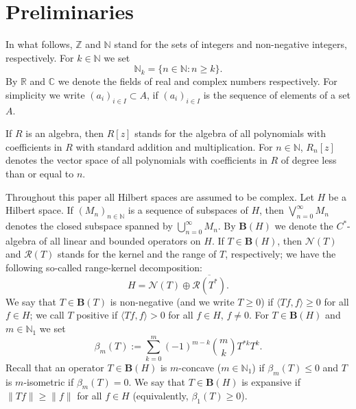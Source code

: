 \documentclass{amsart}
\renewcommand{\le}{\leqslant}
\renewcommand{\ge}{\geqslant}
\theoremstyle{definition}
\numberwithin{equation}{section}
\begin{document}
\section{Preliminaries}
\label{SecPreliminaries}
In what follows, $ \mathbb{Z} $ and $ \mathbb{N} $ stand for the sets of integers and non-negative integers, respectively. For $ k\in \mathbb{N} $ we set
\begin{equation*}
    \mathbb{N}_{k} = \{n\in \mathbb{N}\colon n\ge k \}.
\end{equation*}
By $ \mathbb{R} $ and $ \mathbb{C} $ we denote the fields of real and complex numbers respectively. For simplicity we write $ (a_{i})_{i\in I} \subset A $, if $ (a_{i})_{i\in I} $ is the sequence of elements of a set $ A $.\par
If $ R $ is an algebra, then $ R[z] $ stands for the algebra of all polynomials with coefficients in $ R $ with standard addition and multiplication. For $ n\in \mathbb{N} $, $ R_{n}[z] $ denotes the vector space of all polynomials with coefficients in $ R $ of degree less than or equal to $ n $.\par
Throughout this paper all Hilbert spaces are assumed to be complex. Let $ H $ be a Hilbert space. If $ (M_{n})_{n\in \mathbb{N}} $ is a sequence of subspaces of $ H $, then $ \bigvee_{n=0}^{\infty}M_{n} $ denotes the closed subspace spanned by $ \bigcup_{n=0}^{\infty}M_{n} $. By $ \mathbf{B}(H) $ we denote the $ C^{\ast} $-algebra of all linear and bounded operators on $ H $. If $ T\in \mathbf{B}(H) $, then $ \mathcal{N}(T) $ and $ \mathcal{R}(T) $ stands for the kernel and the range of $ T $, respectively; we have the following so-called range-kernel decomposition:
\begin{equation}
    \label{FormRangeKernelDecomp}
    H = \mathcal{N}(T)\oplus \overline{\mathcal{R}(T^{\ast})}.
\end{equation}
We say that $ T\in \mathbf{B}(T) $ is non-negative (and we write $ T\ge 0 $) if $ \langle Tf,f\rangle \ge 0 $ for all $ f\in H $; we call $ T $ positive if $ \langle Tf,f\rangle > 0 $ for all $ f\in H $, $ f\not=0 $. For $ T\in \mathbf{B}(H) $ and $ m\in \mathbb{N}_{1} $ we set
\begin{equation*}
    \beta_{m}(T) := \sum_{k=0}^{m} (-1)^{m-k}\binom{m}{k}T^{\ast k}T^{k}.
\end{equation*}
Recall that an operator $ T\in \mathbf{B}(H) $ is $ m $-concave ($ m\in \mathbb{N}_{1} $) if $ \beta_{m}(T) \le 0 $ and $ T $ is $ m $-isometric if $ \beta_{m}(T) = 0 $. We say that $ T\in \mathbf{B}(H) $ is expansive if $ \lVert Tf\rVert \ge \lVert f\rVert $ for all $ f\in H $ (equivalently, $ \beta_{1}(T) \ge 0 $).\par
\end{document}
